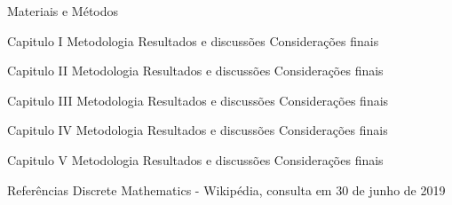     Materiais e Métodos

Capitulo I
    Metodologia
    Resultados e discussões
    Considerações finais

Capitulo II
    Metodologia
    Resultados e discussões
    Considerações finais

Capitulo III
    Metodologia
    Resultados e discussões
    Considerações finais

Capitulo IV
    Metodologia
    Resultados e discussões
    Considerações finais

Capitulo V
    Metodologia
    Resultados e discussões
    Considerações finais

Referências
    Discrete Mathematics - Wikipédia, consulta em 30 de junho de 2019